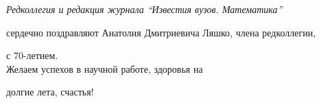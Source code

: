 




\newcommand{\tl}[3]{\medskip\noindent{\bf#1}\ #2 \dotfill #3 \par} 


\pagestyle{empty}









\phantom{a}


\bigskip





\bigskip





\bigskip





\bigskip





\bigskip





\vspace{5cm}





\begin{center}





{\it Редколлегия и редакция журнала ``Известия вузов. Математика''


сердечно поздравляют Анатолия Дмитриевича Ляшко, члена редколлегии,


с 70-летием.\\ Желаем успехов в научной работе, здоровья на


долгие лета, счастья!}





\end{center}








